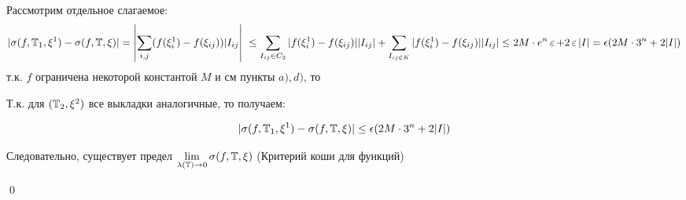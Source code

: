 \documentclass[a4paper]{article}
\begin{document}
\begin{itemize}
    Рассмотрим отдельное слагаемое:
    \begin{equation*}
        \begin{aligned}
            |\sigma(f, \T_1, \xi^1) - \sigma(f, \T, \xi)| = \left|\sum_{i, j}(f(\xi_i^1) - f(\xi_{ij}))|I_{ij}\right|\
            \le \sum_{I_{ij}\in C_3}|f(\xi_i^1) - f(\xi_{ij})||I_{ij}| + \sum_{I_{ij\in K}}|f(\xi_i^1)-f(\xi_{ij})||I_{ij}|\le 2M\cdot e^n\ve + 2\ve |I| = \epsilon(2M\cdot 3^n + 2|I|)
        \end{aligned}
    \end{equation*}
    т.к. $f$ ограничена некоторой константой $M$ и см пункты $a), d)$, то

    Т.к. для $(\operatorname{\mathbb{T}}_2, \xi^2)$ все выкладки аналогичные, то получаем:
    
    \begin{equation*}
         |\sigma(f, \operatorname{\mathbb{T}}_1, \xi^1) - \sigma(f, \operatorname{\mathbb{T}}, \xi)| \le \epsilon(2M\cdot 3^n + 2|I|)
    \end{equation*}

        Следовательно, существует предел $\displaystyle\lim_{\lambda(\operatorname{\mathbb{T}})\to0}\sigma(f, \operatorname{\mathbb{T}}, \xi)$ (Критерий коши для функций)
\end{itemize} \qed
\end{document}
